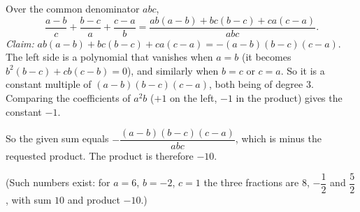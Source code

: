 Over the common denominator $abc$,
\[\dfrac{a-b}{c}+\dfrac{b-c}{a}+\dfrac{c-a}{b}=\dfrac{ab(a-b)+bc(b-c)+ca(c-a)}{abc}.\]
\emph{Claim:} $ab(a-b)+bc(b-c)+ca(c-a)=-(a-b)(b-c)(c-a)$. The left side is a polynomial that vanishes when $a=b$ (it becomes $b^2(b-c)+cb(c-b)=0$), and similarly when $b=c$ or $c=a$. So it is a constant multiple of $(a-b)(b-c)(c-a)$, both being of degree $3$. Comparing the coefficients of $a^2b$ ($+1$ on the left, $-1$ in the product) gives the constant $-1$.

So the given sum equals $-\dfrac{(a-b)(b-c)(c-a)}{abc}$, which is minus the requested product. The product is therefore $\boxed{-10}$.

(Such numbers exist: for $a=6$, $b=-2$, $c=1$ the three fractions are $8$, $-\dfrac12$ and $\dfrac52$, with sum $10$ and product $-10$.)
